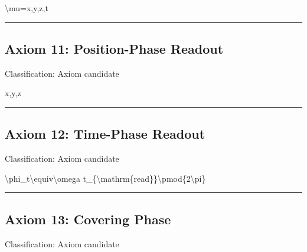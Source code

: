 \documentclass[
  a4paper]{article}
\newenvironment{Shaded}{}{}
\newcommand{\NormalTok}[1]{#1}
\begin{document}
\begin{Shaded}
\begin{Highlighting}[]
\NormalTok{\textbackslash{}mu=x,y,z,t}
\end{Highlighting}
\end{Shaded}

\begin{center}\rule{0.5\linewidth}{0.5pt}\end{center}

\subsection{Axiom 11: Position-Phase
Readout}\label{axiom-11-position-phase-readout}

Classification: Axiom candidate

\begin{Shaded}
\begin{Highlighting}[]
\NormalTok{x,y,z}
\end{Highlighting}
\end{Shaded}

\begin{center}\rule{0.5\linewidth}{0.5pt}\end{center}

\subsection{Axiom 12: Time-Phase
Readout}\label{axiom-12-time-phase-readout}

Classification: Axiom candidate

\begin{Shaded}
\begin{Highlighting}[]
\NormalTok{\textbackslash{}phi\_t\textbackslash{}equiv\textbackslash{}omega t\_\{\textbackslash{}mathrm\{read\}\}\textbackslash{}pmod\{2\textbackslash{}pi\}}
\end{Highlighting}
\end{Shaded}

\begin{center}\rule{0.5\linewidth}{0.5pt}\end{center}

\subsection{Axiom 13: Covering Phase}\label{axiom-13-covering-phase}

Classification: Axiom candidate
\end{document}

